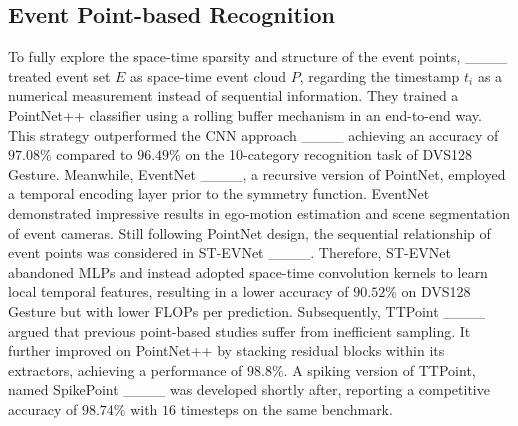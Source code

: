\subsection{Event Point-based Recognition}
To fully explore the space-time sparsity and structure of the event points, ____ treated event set $E$ as space-time event cloud $P$, regarding the timestamp $t_i$ as a numerical measurement instead of sequential information. They trained a PointNet++ classifier using a rolling buffer mechanism in an end-to-end way. This strategy outperformed the CNN approach ____ achieving an accuracy of $97.08\%$ compared to $96.49\%$ on the 10-category recognition task of DVS128 Gesture. Meanwhile, EventNet ____, a recursive version of PointNet, employed a temporal encoding layer prior to the symmetry function. EventNet demonstrated impressive results in ego-motion estimation and scene segmentation of event cameras. Still following PointNet design, the sequential relationship of event points was considered in ST-EVNet ____. Therefore, ST-EVNet abandoned MLPs and instead adopted space-time convolution kernels to learn local temporal features, resulting in a lower accuracy of $90.52\%$ on DVS128 Gesture but with lower FLOPs per prediction. Subsequently, TTPoint ____ argued that previous point-based studies suffer from inefficient sampling. It further improved on PointNet++ by stacking residual blocks within its extractors, achieving a performance of $98.8\%$. A spiking version of TTPoint, named SpikePoint ____ was developed shortly after, reporting a competitive accuracy of $98.74\%$ with $16$ timesteps on the same benchmark.
